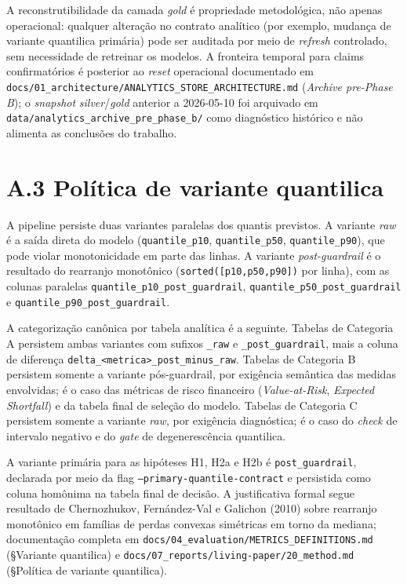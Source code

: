A reconstrutibilidade da camada \textit{gold} é propriedade metodológica, não apenas operacional: qualquer alteração no contrato analítico (por exemplo, mudança de variante quantilica primária) pode ser auditada por meio de \textit{refresh} controlado, sem necessidade de retreinar os modelos. A fronteira temporal para claims confirmatórios é posterior ao \textit{reset} operacional documentado em \texttt{docs/01\_architecture/ANALYTICS\_STORE\_ARCHITECTURE.md} (\textit{Archive pre-Phase B}); o \textit{snapshot} \textit{silver}/\textit{gold} anterior a 2026-05-10 foi arquivado em \texttt{data/analytics\_archive\_pre\_phase\_b/} como diagnóstico histórico e não alimenta as conclusões do trabalho.

\section*{A.3 Política de variante quantilica}

A pipeline persiste duas variantes paralelas dos quantis previstos. A variante \textit{raw} é a saída direta do modelo (\texttt{quantile\_p10}, \texttt{quantile\_p50}, \texttt{quantile\_p90}), que pode violar monotonicidade em parte das linhas. A variante \textit{post-guardrail} é o resultado do rearranjo monotônico (\texttt{sorted([p10,p50,p90])} por linha), com as colunas paralelas \texttt{quantile\_p10\_post\_guardrail}, \texttt{quantile\_p50\_post\_guardrail} e \texttt{quantile\_p90\_post\_guardrail}.

A categorização canônica por tabela analítica é a seguinte. Tabelas de Categoria A persistem ambas variantes com sufixos \texttt{\_raw} e \texttt{\_post\_guardrail}, mais a coluna de diferença \texttt{delta\_<metrica>\_post\_minus\_raw}. Tabelas de Categoria B persistem somente a variante pós-guardrail, por exigência semântica das medidas envolvidas; é o caso das métricas de risco financeiro (\textit{Value-at-Risk}, \textit{Expected Shortfall}) e da tabela final de seleção do modelo. Tabelas de Categoria C persistem somente a variante \textit{raw}, por exigência diagnóstica; é o caso do \textit{check} de intervalo negativo e do \textit{gate} de degenerescência quantilica.

A variante primária para as hipóteses H1, H2a e H2b é \texttt{post\_guardrail}, declarada por meio da flag \texttt{--primary-quantile-contract} e persistida como coluna homônima na tabela final de decisão. A justificativa formal segue resultado de Chernozhukov, Fernández-Val e Galichon (2010) sobre rearranjo monotônico em famílias de perdas convexas simétricas em torno da mediana; documentação completa em \texttt{docs/04\_evaluation/METRICS\_DEFINITIONS.md} (§Variante quantilica) e \texttt{docs/07\_reports/living-paper/20\_method.md} (§Política de variante quantilica).

